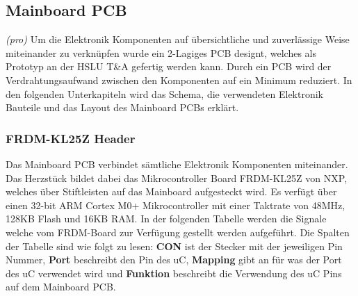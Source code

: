 \subsection{Mainboard PCB}
\textit{(pro)} Um die Elektronik Komponenten auf übersichtliche und zuverlässige Weise miteinander zu verknüpfen wurde ein 2-Lagiges PCB designt, welches als Prototyp an der HSLU T\&A gefertig werden kann. Durch ein PCB wird der Verdrahtungsaufwand zwischen den Komponenten auf ein Minimum reduziert. In den folgenden Unterkapiteln wird das Schema, die verwendeten Elektronik Bauteile und das Layout des Mainboard PCBs erklärt.
\subsubsection{FRDM-KL25Z Header}
Das Mainboard PCB verbindet sämtliche Elektronik Komponenten miteinander. Das Herzstück bildet dabei das Mikrocontroller Board FRDM-KL25Z von NXP, welches über Stiftleisten auf das Mainboard aufgesteckt wird. Es verfügt über einen 32-bit ARM Cortex M0+ Mikrocontroller mit einer Taktrate von 48MHz, 128KB Flash und 16KB RAM. In der folgenden Tabelle werden die Signale welche vom FRDM-Board zur Verfügung gestellt werden aufgeführt. Die Spalten der Tabelle sind wie folgt zu lesen: \textbf{CON} ist der Stecker mit der jeweiligen Pin Nummer, \textbf{Port} beschreibt den Pin des uC, \textbf{Mapping} gibt an für was der Port des uC verwendet wird und \textbf{Funktion} beschreibt die Verwendung des uC Pins auf dem Mainboard PCB.

